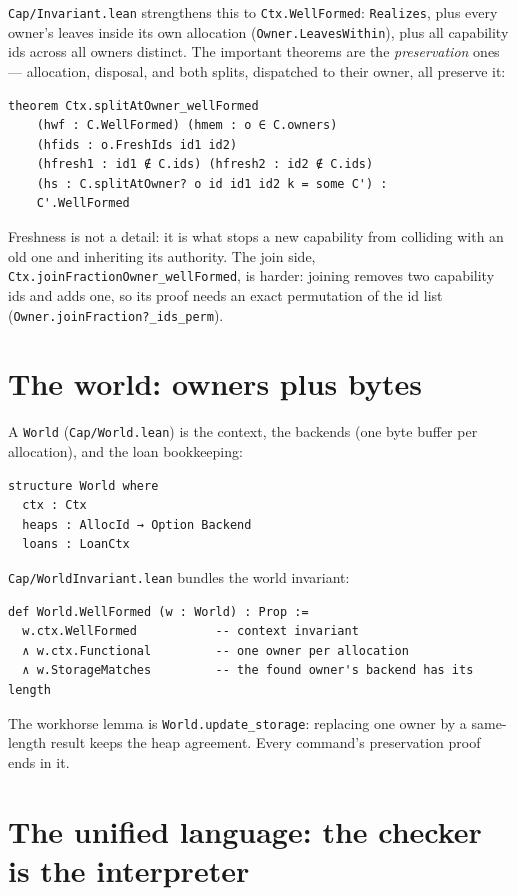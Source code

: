 \documentclass[10pt,a4paper]{article}
\newcommand{\file}[1]{\texttt{#1}}
\newcommand{\lean}[1]{\texttt{#1}}
\begin{document}
\file{Cap/Invariant.lean} strengthens this to \lean{Ctx.WellFormed}:
\lean{Realizes}, plus every owner's leaves inside its own allocation
(\lean{Owner.LeavesWithin}), plus all capability ids across all owners distinct.
The important theorems are the \emph{preservation} ones --- allocation,
disposal, and both splits, dispatched to their owner, all preserve it:

\begin{lstlisting}
theorem Ctx.splitAtOwner_wellFormed
    (hwf : C.WellFormed) (hmem : o ∈ C.owners)
    (hfids : o.FreshIds id1 id2)
    (hfresh1 : id1 ∉ C.ids) (hfresh2 : id2 ∉ C.ids)
    (hs : C.splitAtOwner? o id id1 id2 k = some C') :
    C'.WellFormed
\end{lstlisting}

Freshness is not a detail: it is what stops a new capability from colliding with
an old one and inheriting its authority. The join side,
\lean{Ctx.joinFractionOwner\_wellFormed}, is harder: joining removes two
capability ids and adds one, so its proof needs an exact permutation of the id
list (\lean{Owner.joinFraction?\_ids\_perm}).

\section{The world: owners plus bytes}

A \lean{World} (\file{Cap/World.lean}) is the context, the backends (one byte
buffer per allocation), and the loan bookkeeping:

\begin{lstlisting}
structure World where
  ctx : Ctx
  heaps : AllocId → Option Backend
  loans : LoanCtx
\end{lstlisting}

\file{Cap/WorldInvariant.lean} bundles the world invariant:

\begin{lstlisting}
def World.WellFormed (w : World) : Prop :=
  w.ctx.WellFormed           -- context invariant
  ∧ w.ctx.Functional         -- one owner per allocation
  ∧ w.StorageMatches         -- the found owner's backend has its length
\end{lstlisting}

The workhorse lemma is \lean{World.update\_storage}: replacing one owner by a
same-length result keeps the heap agreement. Every command's preservation proof
ends in it.

\section{The unified language: the checker is the interpreter}
\end{document}
